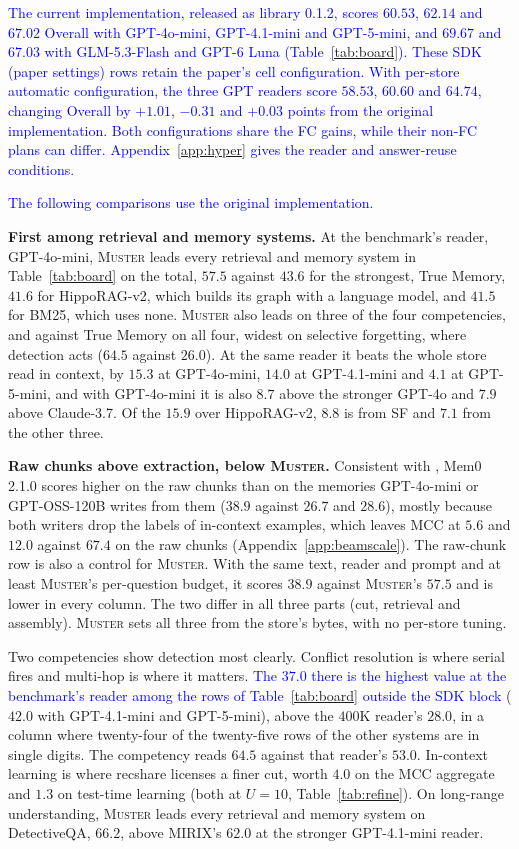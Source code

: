 \documentclass{article}
\newcommand{\nativechange}[1]{\textcolor{blue}{#1}}
\newcommand{\sys}{\textsc{Muster}}
\newcommand{\serial}{\textsf{serial}}
\newcommand{\cov}{\textsf{recshare}}
\begin{document}
\nativechange{The current implementation, released as library 0.1.2, scores $60.53$, $62.14$ and $67.02$ Overall with GPT-4o-mini, GPT-4.1-mini and GPT-5-mini, and $69.67$ and $67.03$ with GLM-5.3-Flash and GPT-6 Luna (Table~\ref{tab:board}). These SDK (paper settings) rows retain the paper's cell configuration. With per-store automatic configuration, the three GPT readers score $58.53$, $60.60$ and $64.74$, changing Overall by $+1.01$, $-0.31$ and $+0.03$ points from the original implementation. Both configurations share the FC gains, while their non-FC plans can differ. Appendix~\ref{app:hyper} gives the reader and answer-reuse conditions.}

\nativechange{The following comparisons use the original implementation.}

\textbf{First among retrieval and memory systems.} At the benchmark's reader, GPT-4o-mini, \sys{} leads every retrieval and memory system in
Table~\ref{tab:board} on the total, $57.5$ against $43.6$ for the strongest, True Memory, $41.6$ for HippoRAG-v2, which builds its graph with a language model, and $41.5$ for BM25, which uses none. \sys{} also leads on three of the four competencies, and against True Memory on all four, widest on selective forgetting, where detection acts ($64.5$ against $26.0$). At the
same reader it beats the whole store read in context, by $15.3$ at GPT-4o-mini, $14.0$ at GPT-4.1-mini and
$4.1$ at GPT-5-mini, and with GPT-4o-mini it is also $8.7$ above the stronger GPT-4o and $7.9$ above Claude-3.7. Of the $15.9$ over HippoRAG-v2, $8.8$ is from SF and $7.1$ from the other three.

\textbf{Raw chunks above extraction, below \sys{}.} Consistent with \cite{fidelity}, Mem0 2.1.0 scores higher on the raw chunks than on the memories GPT-4o-mini or GPT-OSS-120B writes from them ($38.9$ against $26.7$ and $28.6$), mostly because both writers drop the labels of in-context examples, which leaves MCC at $5.6$ and $12.0$ against $67.4$ on the raw chunks (Appendix~\ref{app:beamscale}). The raw-chunk row is also a control for \sys{}. With the same text, reader and prompt and at least \sys{}'s per-question budget, it scores $38.9$ against \sys{}'s $57.5$ and is lower in every column. The two differ in all three parts (cut, retrieval and assembly). \sys{} sets all three from the store's bytes, with no per-store tuning.

Two competencies show detection most clearly. Conflict resolution is where \serial{} fires and
multi-hop is where it matters. \nativechange{The $37.0$ there is the highest value at the benchmark's reader among the rows of Table~\ref{tab:board} outside the SDK block} ($42.0$ with GPT-4.1-mini and GPT-5-mini), above the
$400$K reader's $28.0$, in a column where twenty-four of the twenty-five rows of the other systems are in single digits.
The competency reads $64.5$ against that reader's $53.0$.
In-context learning is where \cov{} licenses a finer cut, worth $4.0$ on the MCC aggregate and $1.3$ on test-time learning (both at $U=10$, Table~\ref{tab:refine}). On long-range understanding, \sys{} leads every retrieval and memory system on DetectiveQA, $66.2$, above MIRIX's $62.0$ at the stronger GPT-4.1-mini reader.
\end{document}
